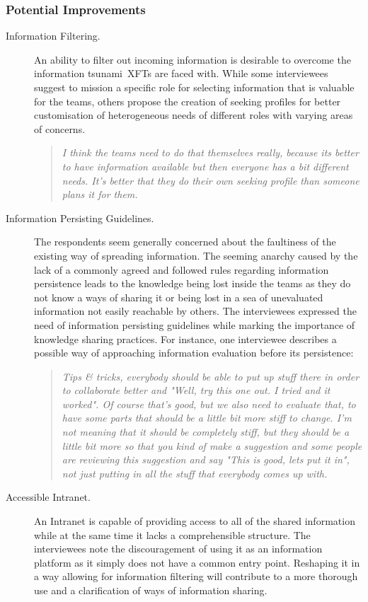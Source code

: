 \subsubsection{Potential Improvements}

\begin{description}

   \item[Information Filtering.] An ability to filter out incoming information is desirable to overcome the information tsunami~\acp{XFT} are faced with. While some interviewees suggest to mission a specific role for selecting information that is valuable for the teams, others propose the creation of seeking profiles for better customisation of heterogeneous needs of different roles with varying areas of concerns.
   
   \begin{quote}\itshape I think the teams need to do that themselves really, because its better to have information available but then everyone has a bit different needs. It's better that they do their own seeking profile than someone plans it for them.
   \end{quote}

   \item[Information Persisting Guidelines.] The respondents seem generally concerned about the faultiness of the existing way of spreading information. The seeming anarchy caused by the lack of a commonly agreed and followed rules regarding information persistence leads to the knowledge being lost inside the teams as they do not know a ways of sharing it or being lost in a sea of unevaluated information not easily reachable by others. The interviewees expressed the need of information persisting guidelines while marking the importance of knowledge sharing practices. For instance, one interviewee describes a possible way of approaching information evaluation before its persistence:
  
  \begin{quote}\itshape Tips \& tricks, everybody should be able to put up stuff there in order to collaborate better and "Well, try this one out. I tried and it worked". Of course that's good, but we also need to evaluate that, to have some parts that should be a little bit more stiff to change. I'm not meaning that it should be completely stiff, but they should be a little bit more so that you kind of make a suggestion and some people are reviewing this suggestion and say "This is good, lets put it in", not just putting in all the stuff that everybody comes up with.
   \end{quote}

   \item[Accessible Intranet.] An Intranet is capable of providing access to all of the shared information while at the same time it lacks a comprehensible structure. The interviewees note the discouragement of using it as an information platform as it simply does not have a common entry point. Reshaping it in a way allowing for information filtering will contribute to a more thorough use and a clarification of ways of information sharing.
   
\end{description}

